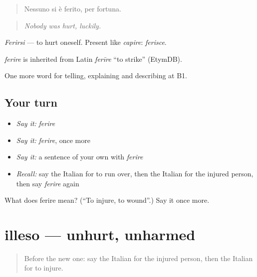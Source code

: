 \begin{quote}
Nessuno si è ferito, per fortuna.
\end{quote}

\begin{quote}
\emph{Nobody was hurt, luckily.}
\end{quote}

\emph{Ferirsi} — to hurt oneself. Present like \emph{capire}: \emph{ferisce}.

\begin{cousinweb}
\emph{ferire} is inherited from Latin \emph{ferīre} \textquotedblleft{}to strike\textquotedblright{} (EtymDB).
\end{cousinweb}

\begin{grammarlens}[title={What you've built}]
One more word for telling, explaining and describing at B1.
\end{grammarlens}

\subsection*{Your turn}
\begin{itemize}
\raggedright
  \item \emph{Say it:} \emph{ferire}
  \item \emph{Say it:} \emph{ferire}, once more
  \item \emph{Say it:} a sentence of your own with \emph{ferire}
  \item \emph{Recall:} say the Italian for to run over, then the Italian for the injured person, then say \emph{ferire} again
\end{itemize}

\begin{tcolorbox}[breakable,colback=teal!4,colframe=teal!35!black,title={Before you move on}]
What does ferire mean? (\textquotedblleft{}To injure, to wound\textquotedblright{}.) Say it once more.
\end{tcolorbox}
\section[illeso]{illeso — unhurt, unharmed}

\label{lesson:IT-C300-illeso}



\begin{quote}
Before the new one: say the Italian for the injured person, then the Italian for to injure.
\end{quote}

